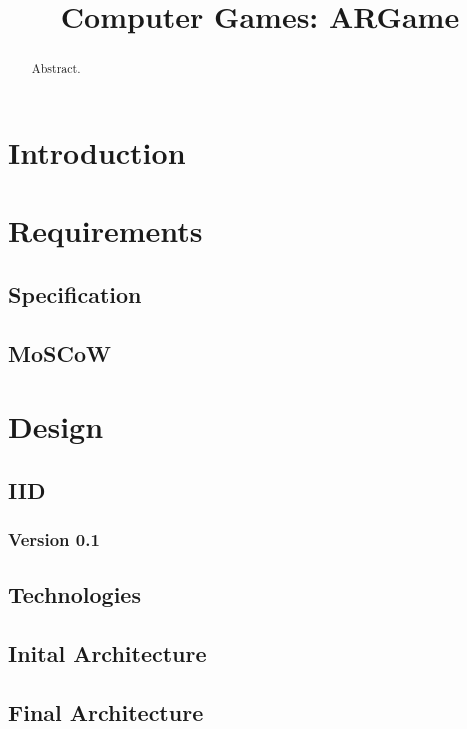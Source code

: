 \documentclass{cmppgr}
\title{Computer Games: ARGame}
\begin{document}
\maketitle

\begin{abstract}

Abstract.

\end{abstract}

\section{Introduction}

\section{Requirements}

\subsection{Specification}
\subsection{MoSCoW}

\section{Design}

\subsection{IID}
\subsubsection{Version 0.1}


\subsection{Technologies}
\subsection{Inital Architecture}
\subsection{Final Architecture}
\end{document}
